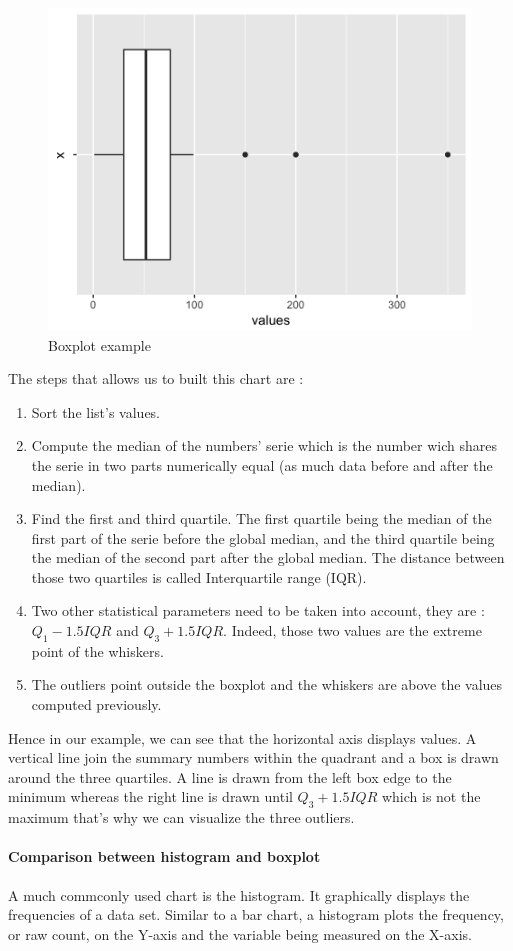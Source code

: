 \documentclass{article}
\begin{document}
\begin{figure}[!ht]
\centering
\includegraphics[width=.5\textwidth]{question3.png}
 \caption{Boxplot example}
\label{boxplot}
\end{figure}

The steps that allows us to built this chart are :
\begin{enumerate}
  \item Sort the list's values.
  \item Compute the median of the numbers' serie which is the number wich shares the serie in two parts numerically equal (as much data before and after the median).
  \item Find the first and third quartile. The first quartile being the median of the first part of the serie before the global median, and the third quartile being the median of the second part after the global median. The distance between those two quartiles is called Interquartile range (IQR).
  \item Two other statistical parameters need to be taken into account, they are : $Q_1-1.5 IQR$ and $Q_3 + 1.5 IQR$. Indeed, those two values are the extreme point of the whiskers.
  \item The outliers point outside the boxplot and the whiskers are above the values computed previously.
\end{enumerate}

Hence in our example, we can see that the horizontal axis displays values. 
A vertical line join the summary numbers within the quadrant and a box is drawn around the three quartiles. A line is drawn from the left box edge to the minimum whereas the right line is drawn until $Q_3 + 1.5 IQR$ which is not the maximum that's why we can visualize the three outliers.

\paragraph{Comparison between histogram and boxplot}
A much commconly used chart is the histogram. It graphically displays the frequencies of a data set. Similar to a bar chart, a histogram plots the frequency, or raw count, on the Y-axis and the variable being measured on the X-axis.
\end{document}
